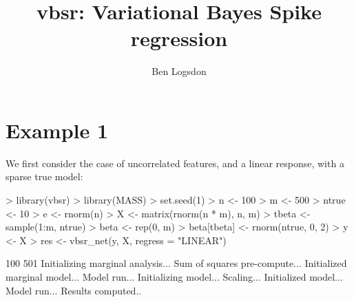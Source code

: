 \documentclass[a4paper]{article}
\title{vbsr: Variational Bayes Spike regression}
\author{Ben Logsdon}
\begin{document}
\maketitle
\section{Example 1}
We first consider the case of uncorrelated features, and a linear response, with a sparse true model:

\begin{Schunk}
\begin{Sinput}
> library(vbsr)
> library(MASS)
> set.seed(1)
> n <- 100
> m <- 500
> ntrue <- 10
> e <- rnorm(n)
> X <- matrix(rnorm(n * m), n, m)
> tbeta <- sample(1:m, ntrue)
> beta <- rep(0, m)
> beta[tbeta] <- rnorm(ntrue, 0, 2)
> y <- X %*% beta + e
> res <- vbsr_net(y, X, regress = "LINEAR")
\end{Sinput}
\begin{Soutput}
[1] 100 501
Initializing marginal analysis...
Sum of squares pre-compute...
Initialized marginal model...
Model run...
Initializing model...
Scaling...
Initialized model...
Model run...
Results computed..
\end{Soutput}
\end{Schunk}
\end{document}
